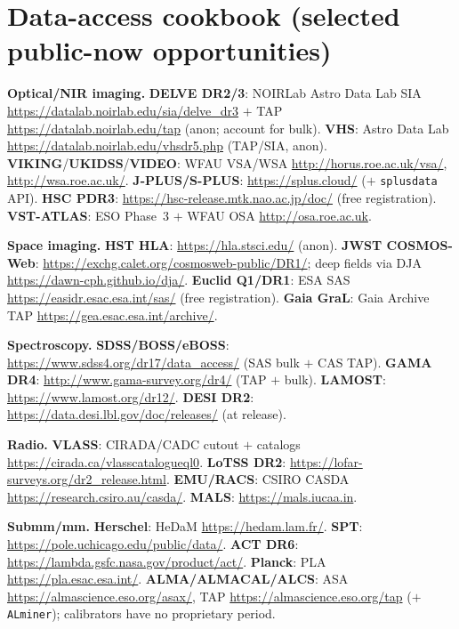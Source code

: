 \documentclass[11pt,letterpaper]{article}
\newcommand{\survey}[1]{\textbf{#1}}
\begin{document}
\appendix
\section{Data-access cookbook (selected public-now opportunities)}
\noindent\textbf{Optical/NIR imaging.}
\survey{DELVE DR2/3}: NOIRLab Astro Data Lab SIA \url{https://datalab.noirlab.edu/sia/delve_dr3} $+$
TAP \url{https://datalab.noirlab.edu/tap} (anon; account for bulk).
\survey{VHS}: Astro Data Lab \url{https://datalab.noirlab.edu/vhsdr5.php} (TAP/SIA, anon).
\survey{VIKING}/\survey{UKIDSS}/\survey{VIDEO}: WFAU VSA/WSA \url{http://horus.roe.ac.uk/vsa/},
\url{http://wsa.roe.ac.uk/}.
\survey{J-PLUS/S-PLUS}: \url{https://splus.cloud/} ($+$ \texttt{splusdata} API).
\survey{HSC PDR3}: \url{https://hsc-release.mtk.nao.ac.jp/doc/} (free registration).
\survey{VST-ATLAS}: ESO Phase~3 $+$ WFAU OSA \url{http://osa.roe.ac.uk}.

\smallskip\noindent\textbf{Space imaging.}
\survey{HST HLA}: \url{https://hla.stsci.edu/} (anon).
\survey{JWST COSMOS-Web}: \url{https://exchg.calet.org/cosmosweb-public/DR1/}; deep fields via DJA
\url{https://dawn-cph.github.io/dja/}.
\survey{Euclid Q1/DR1}: ESA SAS \url{https://easidr.esac.esa.int/sas/} (free registration).
\survey{Gaia GraL}: Gaia Archive TAP \url{https://gea.esac.esa.int/archive/}.

\smallskip\noindent\textbf{Spectroscopy.}
\survey{SDSS/BOSS/eBOSS}: \url{https://www.sdss4.org/dr17/data_access/} (SAS bulk $+$ CAS TAP).
\survey{GAMA DR4}: \url{http://www.gama-survey.org/dr4/} (TAP $+$ bulk).
\survey{LAMOST}: \url{https://www.lamost.org/dr12/}.
\survey{DESI DR2}: \url{https://data.desi.lbl.gov/doc/releases/} (at release).

\smallskip\noindent\textbf{Radio.}
\survey{VLASS}: CIRADA/CADC cutout $+$ catalogs \url{https://cirada.ca/vlasscatalogueql0}.
\survey{LoTSS DR2}: \url{https://lofar-surveys.org/dr2_release.html}.
\survey{EMU/RACS}: CSIRO CASDA \url{https://research.csiro.au/casda/}.
\survey{MALS}: \url{https://mals.iucaa.in}.

\smallskip\noindent\textbf{Submm/mm.}
\survey{Herschel}: HeDaM \url{https://hedam.lam.fr/}.
\survey{SPT}: \url{https://pole.uchicago.edu/public/data/}.
\survey{ACT DR6}: \url{https://lambda.gsfc.nasa.gov/product/act/}.
\survey{Planck}: PLA \url{https://pla.esac.esa.int/}.
\survey{ALMA/ALMACAL/ALCS}: ASA \url{https://almascience.eso.org/asax/}, TAP
\url{https://almascience.eso.org/tap} ($+$ \texttt{ALminer}); calibrators have no proprietary period.
\end{document}
